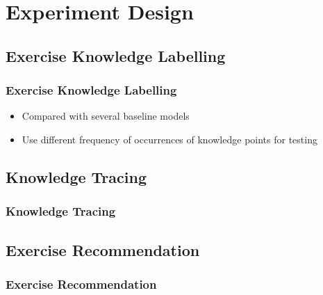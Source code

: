 \documentclass{beamer}
\begin{document}
\section{Experiment Design}
\subsection{Exercise Knowledge Labelling}
\begin{frame}
  \frametitle{Exercise Knowledge Labelling}
  \begin{itemize}
    \item Compared with several baseline models
    \item Use different frequency of occurrences of knowledge points for testing
  \end{itemize}


\end{frame}

\subsection{Knowledge Tracing}
\begin{frame}
  \frametitle{Knowledge Tracing}



\end{frame}

\subsection{Exercise Recommendation}
\begin{frame}
  \frametitle{Exercise Recommendation}



\end{frame}
\end{document}
